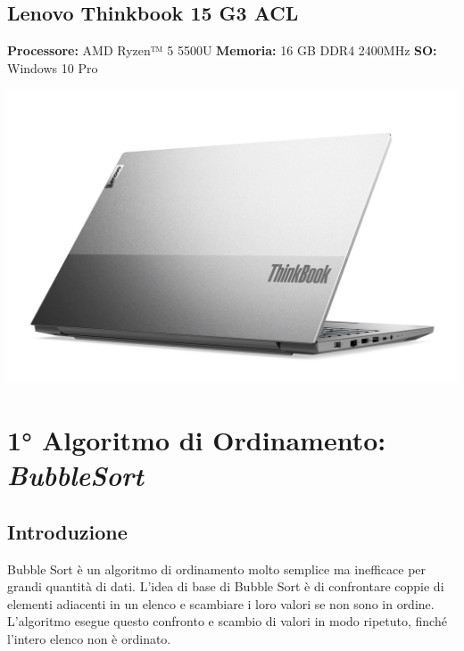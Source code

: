 \documentclass{article}
\begin{document}
		\subsection{Lenovo Thinkbook 15 G3 ACL}
			\begin{minipage}{0.6\textwidth}\raggedright
				\textbf{Processore:}
				\hspace{1mm} AMD Ryzen™ 5 5500U
				\newline
				\newline
				\textbf{Memoria:}
				\hspace{4mm} 16 GB DDR4 2400MHz
				\newline
				\newline
				\textbf{SO:}
				\hspace{15mm} Windows 10 Pro
			\end{minipage}
			\begin{minipage}{0.3\textwidth}
				\includegraphics[width=\linewidth]{./Imgs/PersonalComputer.jpg}
			\end{minipage}
		
	\newpage
	\section{1° Algoritmo di Ordinamento: \textit{BubbleSort}}
		\subsection{Introduzione}
			Bubble Sort è un algoritmo di ordinamento molto semplice ma inefficace per grandi quantità di dati. L'idea di base di Bubble Sort è di confrontare coppie di elementi adiacenti in un elenco e scambiare i loro valori se non sono in ordine. L'algoritmo esegue questo confronto e scambio di valori in modo ripetuto, finché l'intero elenco non è ordinato.
			
\end{document}
